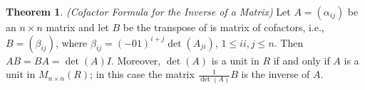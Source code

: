 \documentclass[10pt]{article}
\theoremstyle{definition}
\newtheorem{thm}{Theorem}[section]
\newcommand{\nl}{\vspace{7em}}
\newcommand{\al}{\alpha}
\newcommand{\be}{\beta}
\begin{document}
\nl

\begin{thm}\textit{(Cofactor Formula for the Inverse of a Matrix)} Let $A = (\al_{ij})$ be an $n\times n$ matrix and let $B$ be the transpose of is matrix of cofactors, i.e., $B = (\be_{ij})$, where $\be_{ij} = (-01)^{i + j}\det(A_{ji})$, $1\leq ii,j\leq n$. Then $AB = BA = \det(A)I$. Moreover, $\det(A)$ is a unit in $R$ if and only if $A$ is a unit in $M_{n\times n}(R)$; in this case the matrix $\frac{1}{\det(A)} B$ is the inverse of $A$.
\end{thm}
\end{document}
